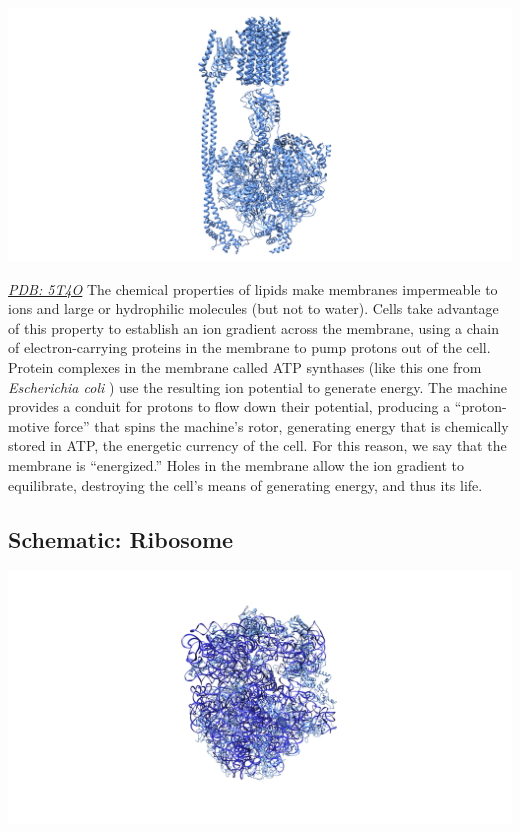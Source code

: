 \documentclass[]{tufte-book}
\begin{document}
\includegraphics{img/schematics/2_1_2}

\href{http://rcsb.org/structure/5T4O}{\emph{PDB: 5T4O}}
The chemical properties of lipids make membranes impermeable to ions and large or hydrophilic molecules (but not to water). Cells take advantage of this property to establish an ion gradient across the membrane, using a chain of electron-carrying proteins in the membrane to pump protons out of the cell. Protein complexes in the membrane called ATP synthases (like this one from \emph{Escherichia coli} \citep{sobti2016}) use the resulting ion potential to generate energy. The machine provides a conduit for protons to flow down their potential, producing a ``proton-motive force'' that spins the machine's rotor, generating energy that is chemically stored in ATP, the energetic currency of the cell. For this reason, we say that the membrane is ``energized.'' Holes in the membrane allow the ion gradient to equilibrate, destroying the cell's means of generating energy, and thus its life.

\hypertarget{Ribosome}{%
\subsection*{Schematic: Ribosome}\label{Ribosome}}

\includegraphics{img/schematics/2_1_3}
\end{document}
